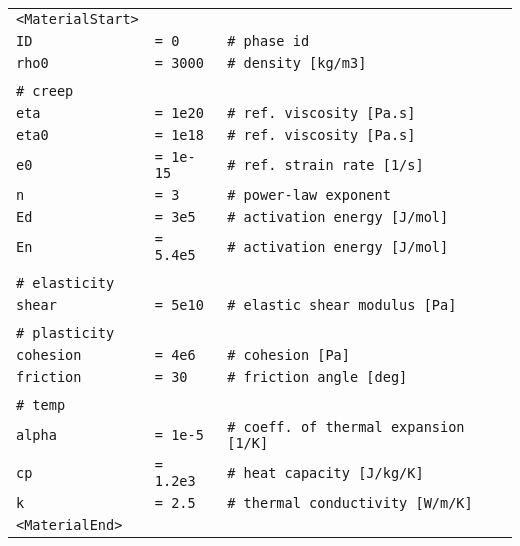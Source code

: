 \documentclass[a4paper,11pt]{article}
\begin{document}
\begin{tabular}{l l l}
\small
\indent \texttt{<MaterialStart>}&&\\
\indent \indent \texttt{ID}&\texttt{= 0}&\texttt{\# phase id}\\
\indent \indent \texttt{rho0 }&\texttt{= 3000}&\texttt{\# density [kg/m3]}\\
&&\\
\indent \indent \texttt{\# creep}&&\\
\indent \indent \texttt{eta  }&\texttt{= 1e20}&\texttt{\# 	ref. viscosity [Pa.s]}\\
\indent \indent \texttt{eta0 }&\texttt{= 1e18}&\texttt{\# 	ref. viscosity [Pa.s]}\\
\indent \indent \texttt{e0 }&\texttt{= 1e-15}&\texttt{\# ref. strain rate [1/s]}\\
\indent \indent \texttt{n }&\texttt{= 3}&\texttt{\# power-law exponent}\\
\indent \indent \texttt{Ed}&\texttt{= 3e5}&\texttt{\# activation energy [J/mol]}\\
\indent \indent \texttt{En}&\texttt{= 5.4e5}&\texttt{\# activation energy [J/mol]}\\
&&\\
\indent \indent \texttt{\# elasticity}&&\\
\indent \indent \texttt{shear }&\texttt{= 5e10}&\texttt{\# elastic shear modulus [Pa]}\\
&&\\
\indent \indent \texttt{\# plasticity}&&\\
\indent \indent \texttt{cohesion }&\texttt{= 4e6}&\texttt{\# cohesion [Pa]}\\
\indent \indent \texttt{friction }&\texttt{= 30}&\texttt{\# friction angle [deg]}\\
&&\\
\indent \indent \texttt{\# temp}&&\\
\indent \indent \texttt{alpha }&\texttt{= 1e-5}&\texttt{\# coeff. of thermal expansion [1/K]}\\
\indent \indent \texttt{cp }&\texttt{= 1.2e3}&\texttt{\# heat capacity [J/kg/K]}\\
\indent \indent \texttt{k }&\texttt{= 2.5}&\texttt{\# thermal conductivity [W/m/K]}\\
\indent \texttt{<MaterialEnd>}\\
\end{tabular}\\
\end{document}
